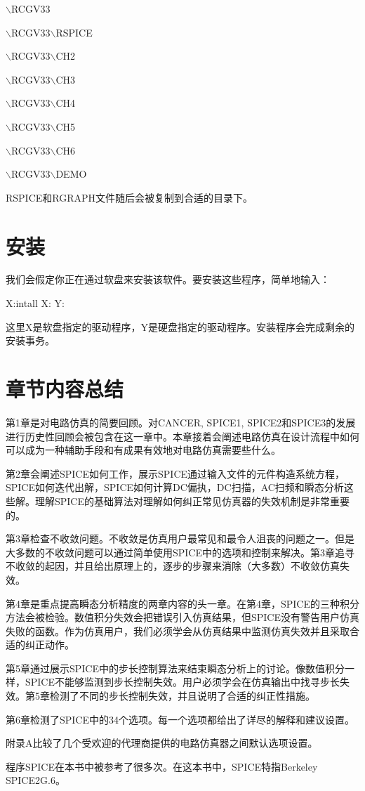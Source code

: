 $\backslash$RCGV33

$\backslash$RCGV33$\backslash$RSPICE

$\backslash$RCGV33$\backslash$CH2

$\backslash$RCGV33$\backslash$CH3

$\backslash$RCGV33$\backslash$CH4

$\backslash$RCGV33$\backslash$CH5

$\backslash$RCGV33$\backslash$CH6

$\backslash$RCGV33$\backslash$DEMO

RSPICE和RGRAPH文件随后会被复制到合适的目录下。

\section{安装}
我们会假定你正在通过软盘来安装该软件。要安装这些程序，简单地输入：

X:intall X: Y:

这里X是软盘指定的驱动程序，Y是硬盘指定的驱动程序。安装程序会完成剩余的安装事务。

\section{章节内容总结}
第1章是对电路仿真的简要回顾。对CANCER, SPICE1, SPICE2和SPICE3的发展进行历史性回顾会被包含在这一章中。本章接着会阐述电路仿真在设计流程中如何可以成为一种辅助手段和有成果有效地对电路仿真需要些什么。

第2章会阐述SPICE如何工作，展示SPICE通过输入文件的元件构造系统方程，SPICE如何迭代出解，SPICE如何计算DC偏执，DC扫描，AC扫频和瞬态分析这些解。理解SPICE的基础算法对理解如何纠正常见仿真器的失效机制是非常重要的。

第3章检查不收敛问题。不收敛是仿真用户最常见和最令人沮丧的问题之一。但是大多数的不收敛问题可以通过简单使用SPICE中的选项和控制来解决。第3章追寻不收敛的起因，并且给出原理上的，逐步的步骤来消除（大多数）不收敛仿真失效。

第4章是重点提高瞬态分析精度的两章内容的头一章。在第4章，SPICE的三种积分方法会被检验。数值积分失效会把错误引入仿真结果，但SPICE没有警告用户仿真失败的函数。作为仿真用户，我们必须学会从仿真结果中监测仿真失效并且采取合适的纠正动作。

第5章通过展示SPICE中的步长控制算法来结束瞬态分析上的讨论。像数值积分一样，SPICE不能够监测到步长控制失效。用户必须学会在仿真输出中找寻步长失效。第5章检测了不同的步长控制失效，并且说明了合适的纠正性措施。

第6章检测了SPICE中的34个选项。每一个选项都给出了详尽的解释和建议设置。

附录A比较了几个受欢迎的代理商提供的电路仿真器之间默认选项设置。

程序SPICE在本书中被参考了很多次。在这本书中，SPICE特指Berkeley SPICE2G.6。